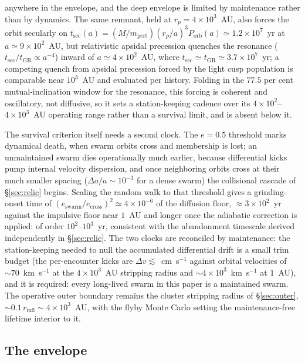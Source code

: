 \documentclass[11pt]{article}
\begin{document}
anywhere in the envelope, and the deep envelope is limited by maintenance rather than by dynamics. The same remnant, held at $r_{p} = 4\times10^{3}$~AU, also forces the orbit secularly on $t_{\mathrm{sec}}(a) = (M/m_{\mathrm{pert}})(r_{p}/a)^{3}P_{\mathrm{orb}}(a) \simeq 1.2\times10^{7}$~yr at $a \simeq 9\times10^{2}$~AU, but relativistic apsidal precession quenches the resonance ($t_{\mathrm{sec}}/t_{\mathrm{GR}} \propto a^{-4}$) inward of $a \simeq 4\times10^{2}$~AU, where $t_{\mathrm{sec}} \simeq t_{\mathrm{GR}} \simeq 3.7\times10^{7}$~yr; a competing quench from apsidal precession forced by the light cusp population is comparable near $10^{3}$~AU and evaluated per history. Folding in the $77.5$ per cent mutual-inclination window for the resonance, this forcing is coherent and oscillatory, not diffusive, so it sets a station-keeping cadence over its $4\times10^{2}$--$4\times10^{3}$~AU operating range rather than a survival limit, and is absent below it.

The survival criterion itself needs a second clock. The $e = 0.5$ threshold marks dynamical death, when swarm orbits cross and membership is lost; an unmaintained swarm dies operationally much earlier, because differential kicks pump internal velocity dispersion, and once neighboring orbits cross at their much smaller spacing ($\Delta a/a \sim 10^{-3}$ for a dense swarm) the collisional cascade of \S\ref{sec:relic} begins. Scaling the random walk to that threshold gives a grinding-onset time of $(e_{\mathrm{swarm}}/e_{\mathrm{cross}})^{2} \simeq 4\times10^{-6}$ of the diffusion floor, $\approx 3\times10^{2}$~yr against the impulsive floor near $1$~AU and longer once the adiabatic correction is applied: of order $10^{2}$--$10^{3}$~yr, consistent with the abandonment timescale derived independently in \S\ref{sec:relic}. The two clocks are reconciled by maintenance: the station-keeping needed to null the accumulated differential drift is a small trim budget (the per-encounter kicks are $\Delta v \lesssim$~cm~s$^{-1}$ against orbital velocities of $\sim 70$~km~s$^{-1}$ at the $4\times10^{3}$~AU stripping radius and $\sim 4\times10^{3}$~km~s$^{-1}$ at $1$~AU), and it is required: every long-lived swarm in this paper is a maintained swarm. The operative outer boundary remains the cluster stripping radius of \S\ref{sec:outer}, $\sim 0.1\,r_{\mathrm{infl}} \sim 4\times10^{3}$~AU, with the flyby Monte Carlo setting the maintenance-free lifetime interior to it.

\subsection{The envelope}
\label{sec:envelopesum}
\end{document}
